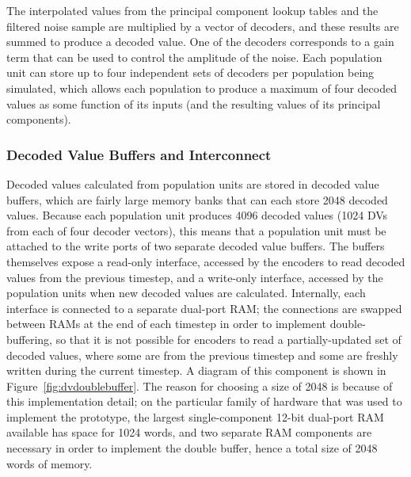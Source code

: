 \documentclass[english]{article}
\begin{document}
The interpolated values from the principal component lookup tables and the filtered noise sample are multiplied by a vector of decoders,
and these results are summed to produce a decoded value. %
One of the decoders corresponds to a gain term that can be used to control the amplitude of the noise.
Each population unit can store up to four independent sets of decoders per population being simulated,
which allows each population to produce a maximum of four decoded values as some function of its inputs
(and the resulting values of its principal components).

\subsubsection{Decoded Value Buffers and Interconnect}

Decoded values calculated from population units are stored in decoded value buffers, which are fairly large memory banks that can each
store 2048 decoded values. 
Because each population unit produces 4096 decoded values (1024 DVs from each of four decoder vectors),
this means that a population unit must be attached to the write ports of two separate decoded value buffers.
The buffers themselves expose a read-only interface, accessed by the encoders to read decoded values from the
previous timestep, and a write-only interface, accessed by the population units when new decoded values are calculated.
Internally, each interface is connected to a separate dual-port RAM; the connections are swapped between RAMs
at the end of each timestep in order to implement double-buffering, so that it is not possible for encoders to read a
partially-updated set of decoded values, where some are from the previous timestep and some are freshly written during the current timestep.
A diagram of this component is shown in Figure~\ref{fig:dvdoublebuffer}.
The reason for choosing a size of 2048 is because of this implementation detail; on the particular family of hardware
that was used to implement the prototype, the largest single-component 12-bit dual-port RAM available has space for 1024 words,
and two separate RAM components are necessary in order to implement the double buffer, hence a total size of 2048 words of memory.
\end{document}
